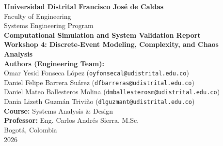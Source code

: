 \documentclass[12pt,a4paper]{article}
\begin{document}
\begin{titlepage}
    \centering
    \vspace*{1cm}
    {\Large \textbf{Universidad Distrital Francisco José de Caldas}} \\
    \vspace{0.4cm}
    {\large Faculty of Engineering \\ Systems Engineering Program} \\
    \vspace{2.5cm}
    {\Huge \textbf{Computational Simulation and System Validation Report}} \\
    \vspace{0.5cm}
    {\Large \textbf{Workshop 4: Discrete-Event Modeling, Complexity, and Chaos Analysis}} \\
    \vspace{2cm}
    \textbf{Authors (Engineering Team):} \\
    Omar Yesid Fonseca López (\texttt{oyfonsecal@udistrital.edu.co}) \\
    Daniel Felipe Barrera Suárez (\texttt{dfbarreras@udistrital.edu.co}) \\
    Daniel Mateo Ballesteros Molina (\texttt{dmballesterosm@udistrital.edu.co}) \\
    Dania Lizeth Guzmán Triviño (\texttt{dlguzmant@udistrital.edu.co}) \\
    \vfill
    \textbf{Course:} Systems Analysis \& Design \\
    \textbf{Professor:} Eng. Carlos Andrés Sierra, M.Sc. \\
    \vspace{1cm}
    Bogotá, Colombia \\
    2026
\end{titlepage}


\begin{abstract}
This document presents the consolidation of \textbf{Workshop 4} for the \textbf{Smart Campus Energy Management System} project at the Sabio Caldas Campus. Building upon the systems analysis from Workshop 1 and the software architecture decisions in the user-space from Workshops 2 and 3, this report implements and validates a discrete-event computational model in Python. The simulation recreates a 12-hour stochastic operational cycle for a cluster of 20 workstations, injecting human behavioral factors (80\% probability of manual shutdown neglect) and technical complexity (15\% high computational load peaks). 

Empirical results conclusively validate the feasibility of the analyzed solution: the autonomous agent achieved a \textbf{68.72\% reduction} in wasted energy consumption, mitigating behavioral inertia without generating false positives that could disrupt high-demand academic tasks (such as rendering or compiling). Finally, the work is evaluated under complexity and chaos theory, demonstrating the stability of decision thresholds against campus dynamics.
\end{abstract}
\end{document}
